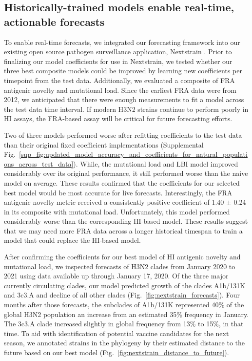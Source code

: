 \subsection*{Historically-trained models enable real-time, actionable forecasts}

To enable real-time forecasts, we integrated our forecasting framework into our existing open source pathogen surveillance application, Nextstrain \cite{Hadfield2018}.
Prior to finalizing our model coefficients for use in Nextstrain, we tested whether our three best composite models could be improved by learning new coefficients per timepoint from the test data.
Additionally, we evaluated a composite of FRA antigenic novelty and mutational load.
Since the earliest FRA data were from 2012, we anticipated that there were enough measurements to fit a model across the test data time interval.
If modern H3N2 strains continue to perform poorly in HI assays, the FRA-based assay will be critical for future forecasting efforts.

Two of three models performed worse after refitting coefficients to the test data than their original fixed coefficient implementations (Supplemental Fig.~\ref{sup_fig:updated_model_accuracy_and_coefficients_for_natural_populations_across_test_data}).
While, the mutational load and LBI model improved considerably over its original performance, it still performed worse than the naive model on average.
These results confirmed that the coefficients for our selected best model would be most accurate for live forecasts.
Interestingly, the FRA antigenic novelty metric received a consistently positive coefficient of 1.40 $\pm$ 0.24 in its composite with mutational load.
Unfortunately, this model performed considerably worse than the corresponding HI-based model.
These results suggest that we may need more FRA data across a longer historical timespan to train a model that could replace the HI-based model.

After confirming the coefficients for our best model of HI antigenic novelty and mutational load, we inspected forecasts of H3N2 clades from January 2020 to 2021 using data available up through January 17, 2020.
Of the three major currently circulating clades, our model predicted growth of the clades A1b/131K and 3c3.A and decline of all other clades (Fig.~\ref{fig:nextstrain_forecasts}).
Four months after those forecasts, the subclades of A1b/131K represented 40\% of the global H3N2 population an increase from an estimated 35\% frequency in January.
The 3c3.A clade increased slightly in global frequency from 13\% to 15\%, in that time.
To aid with identification of potential vaccine candidates for the next season, we annotated strains in the phylogeny by their estimated distance to the future based on our best model (Fig.~\ref{fig:nextstrain_distance_to_future}).


